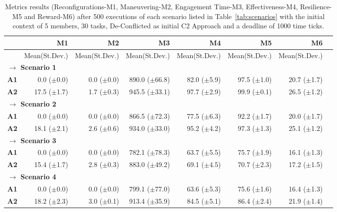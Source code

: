\begin{table}[ht]
	\small
	\fontsize{6.5}{6.5}\selectfont
	\centering
	\caption{Metrics results (Reconfigurations-M1, Maneuvering-M2, Engagement Time-M3, Effectiveness-M4, Resilience-M5 and Reward-M6)  after 500 executions of each scenario listed in Table~\ref{tab:scenarios} with the initial context of 5 members, 30 tasks, De-Conflicted as initial C2 Approach and a deadline of \color{black}1000 time ticks.\color{black}}
	\label{table:results01}
	
	\begin{tabular}{rrrrrrrr} \hline 
	    & \bf{M1}
		& \bf{M2}
        & \bf{M3}
        & \bf{M4}
		& \bf{M5}
		& \bf{M6} \\  \hline 
		
		& Mean(St.Dev.)  & Mean(St.Dev.) & Mean(St.Dev.)  & Mean(St.Dev.) & Mean(St.Dev.) & Mean(St.Dev.)  \\ [1ex]
		
		\multicolumn{7}{l}{\textbf{$\longrightarrow$ Scenario 1 }} \\
\bf{A1}  & 0.0 ($\pm$0.0)  & 0.0 ($\pm$0.0)  & 890.0 ($\pm$66.8)  & 82.0 ($\pm$5.9) & 97.5 ($\pm$1.0) & 20.7 ($\pm$1.7)  \\
\bf{A2}  & 17.5 ($\pm$1.7)  & 1.7 ($\pm$0.3)  & 945.5 ($\pm$33.1)  & 97.7 ($\pm$2.9)  & 99.9 ($\pm$0.1)  & 26.5 ($\pm$1.2)  \\ [1ex]
	
	\multicolumn{6}{l}{\textbf{$\longrightarrow$ Scenario 2 }} \\
\bf{A1}  & 0.0 ($\pm$0.0)  & 0.0 ($\pm$0.0)  & 866.5 ($\pm$72.3)  & 77.5 ($\pm$6.3)  & 92.2 ($\pm$1.7)  & 20.0 ($\pm$1.7)  \\
\bf{A2}  & 18.1 ($\pm$2.1)  & 2.6 ($\pm$0.6)  & 934.0 ($\pm$33.0)  & 95.2 ($\pm$4.2)  & 97.3 ($\pm$1.3)  & 25.1 ($\pm$1.2)  \\ [1ex]
	
	\multicolumn{6}{l}{\textbf{$\longrightarrow$ Scenario 3 }} \\
\bf{A1}  & 0.0 ($\pm$0.0)  & 0.0 ($\pm$0.0)  & 782.1 ($\pm$78.3)  & 63.7 ($\pm$5.5)  & 75.7 ($\pm$1.9)  & 16.1 ($\pm$1.3)  \\
\bf{A2}  & 15.4 ($\pm$1.7)  & 2.8 ($\pm$0.3)  & 883.0 ($\pm$49.2)  & 69.1 ($\pm$4.5)  & 70.7 ($\pm$2.3)  & 17.2 ($\pm$1.5)  \\ [1ex]
	
	\multicolumn{6}{l}{\textbf{$\longrightarrow$ Scenario 4 }} \\
\bf{A1}  & 0.0 ($\pm$0.0)  & 0.0 ($\pm$0.0)  & 799.1 ($\pm$77.0)  & 63.6 ($\pm$5.3)  & 75.6 ($\pm$1.6)  & 16.4 ($\pm$1.3)  \\
\bf{A2}  & 18.2 ($\pm$2.3)  & 3.0 ($\pm$0.1)  & 913.4 ($\pm$35.9)  & 84.5 ($\pm$5.1)  & 86.4 ($\pm$2.4)  & 21.9 ($\pm$1.4)  \\ [1ex]
	

\end{tabular}
\end{table}
